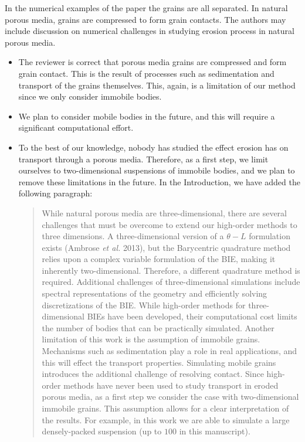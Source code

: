 \documentclass[11pt]{article}
\newcommand{\comment}[1]{{\color{blue} #1}}
\begin{document}
\noindent
\comment{In the numerical examples of the paper the grains are all
separated. In natural porous media, grains are compressed to form grain
contacts. The authors may include discussion on numerical challenges in
studying erosion process in natural porous media.}
\begin{itemize}
  \item The reviewer is correct that porous media grains are compressed
    and form grain contact. This is the result of processes such as
    sedimentation and transport of the grains themselves. This, again,
    is a limitation of our method since we only consider immobile
    bodies.

  \item We plan to consider mobile bodies in the future, and this will
    require a significant computational effort.

  \item To the best of our knowledge, nobody has studied the effect
    erosion has on transport through a porous media. Therefore, as a
    first step, we limit ourselves to two-dimensional suspensions of
    immobile bodies, and we plan to remove these limitations in the
    future. In the Introduction, we have added the following paragraph:
    \begin{quotation}
      \noindent
      While natural porous media are three-dimensional, there are
      several challenges that must be overcome to extend our high-order
      methods to three dimensions.  A three-dimensional version of a
      {$\theta-L$} formulation exists (Ambrose {\em et al.} 2013), but
      the Barycentric quadrature method relies upon a complex variable
      formulation of the BIE, making it inherently two-dimensional.
      Therefore, a different quadrature method is required. Additional
      challenges of three-dimensional simulations include spectral
      representations of the geometry and efficiently solving
      discretizations of the BIE.  While high-order methods for
      three-dimensional BIEs have been developed, their computational
      cost limits the number of bodies that can be practically
      simulated. Another limitation of this work is the assumption of
      immobile grains.  Mechanisms such as sedimentation play a role in
      real applications, and this will effect the transport properties.
      Simulating mobile grains introduces the additional challenge of
      resolving contact.  Since high-order methods have never been used
      to study transport in eroded porous media, as a first step we
      consider the case  with two-dimensional immobile grains. This
      assumption allows for a clear interpretation of the results.  For
      example, in this work we are able to simulate a large
      densely-packed suspension (up to $100$ in this manuscript).


    \end{quotation}
\end{itemize}
\end{document}
